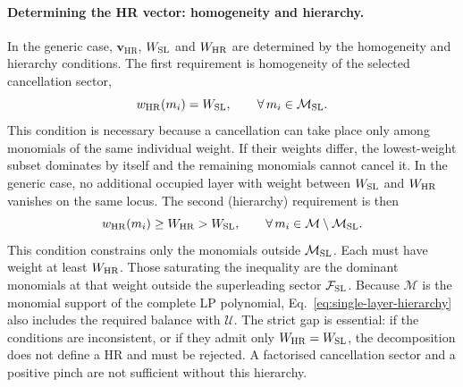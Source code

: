 \documentclass[a4paper,11pt]{article}
\newcommand{\HR}{\mathrm{HR}}
\newcommand{\FSL}{\mathcal F_{\rm SL}}
\newcommand{\MSL}{\mathcal M_{\rm SL}}
\newcommand{\WSL}{W_{\rm SL}}
\newcommand{\WHR}{W_{\rm HR}}
\begin{document}
\paragraph{Determining the HR vector: homogeneity and hierarchy.}

In the generic case, \(\boldsymbol v_{\HR}\), \(\WSL\) and \(\WHR\) are
determined by the homogeneity and hierarchy conditions.  The first
requirement is homogeneity of the selected cancellation sector,
\begin{equation}
 w_{\HR}(m_i)=\WSL,
 \qquad \forall\,m_i\in\MSL.
\label{eq:SLhomogeneity}
\end{equation}
This condition is necessary because a cancellation can take place only among
monomials of the same individual weight.  If their weights
differ, the lowest-weight subset dominates by itself and the remaining
monomials cannot cancel it.  In the generic case, no additional occupied
layer with weight between \(\WSL\) and \(\WHR\) vanishes on the same locus.
The second (hierarchy) requirement is then
\begin{equation}
 w_{\HR}(m_i)\geq\WHR>\WSL,
 \qquad \forall\,m_i\in\mathcal M\setminus\MSL.
\label{eq:single-layer-hierarchy}
\end{equation}
This condition constrains only the monomials outside \(\MSL\).  Each must
have weight at least \(\WHR\).  Those saturating the inequality are the
dominant monomials at that weight outside the superleading sector \(\FSL\).
Because \(\mathcal M\) is the monomial support of the
complete LP polynomial, Eq.~\eqref{eq:single-layer-hierarchy} also includes
the required balance with \(\mathcal U\).  The strict gap is essential: if
the conditions are inconsistent, or if they admit only
\(\WHR=\WSL\), the decomposition does not define a HR and must be rejected.
A factorised cancellation sector and a positive pinch are not sufficient
without this hierarchy.
\end{document}
